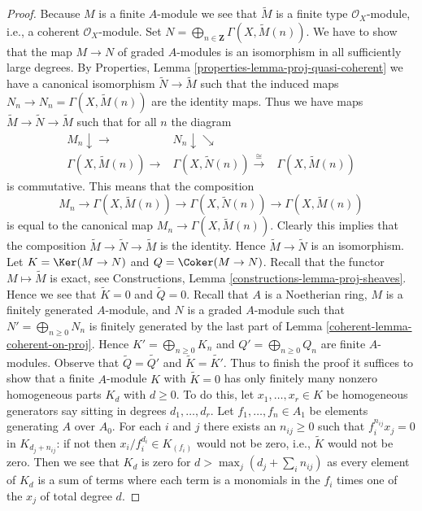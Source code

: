 \begin{proof}
Because $M$ is a finite $A$-module we see that
$\widetilde{M}$ is a finite type $\mathcal{O}_X$-module,
i.e., a coherent $\mathcal{O}_X$-module.
Set $N = \bigoplus_{n \in \mathbf{Z}} \Gamma(X, \widetilde{M}(n))$.
We have to show that the map $M \to N$ of graded $A$-modules
is an isomorphism in all sufficiently large degrees.
By Properties, Lemma \ref{properties-lemma-proj-quasi-coherent}
we have a canonical isomorphism $\widetilde{N} \to \widetilde{M}$
such that the induced maps $N_n \to N_n = \Gamma(X, \widetilde{M}(n))$
are the identity maps. Thus we have maps
$\widetilde{M} \to \widetilde{N} \to \widetilde{M}$
such that for all $n$ the diagram
$$
\begin{array}{ccc}M_n \downarrow\longrightarrow & N_n \downarrow\searrow &  \\ \Gamma(X, \widetilde{M}(n)) \longrightarrow & \Gamma(X, \widetilde{N}(n)) \overset{\cong}{\longrightarrow} & \Gamma(X, \widetilde{M}(n))\end{array}
$$
is commutative. This means that the composition
$$
M_n \to \Gamma(X, \widetilde{M}(n))
\to \Gamma(X, \widetilde{N}(n)) \to \Gamma(X, \widetilde{M}(n))
$$
is equal to the canonical map $M_n \to \Gamma(X, \widetilde{M}(n))$.
Clearly this implies that the composition
$\widetilde{M} \to \widetilde{N} \to \widetilde{M}$
is the identity. Hence $\widetilde{M} \to \widetilde{N}$ is an isomorphism.
Let $K = \Ker(M \to N)$ and $Q = \Coker(M \to N)$.
Recall that the functor $M \mapsto \widetilde{M}$ is exact, see
Constructions, Lemma \ref{constructions-lemma-proj-sheaves}.
Hence we see that $\widetilde{K} = 0$ and $\widetilde{Q} = 0$.
Recall that $A$ is a Noetherian ring, $M$ is a finitely generated
$A$-module, and $N$ is a graded $A$-module such that
$N' = \bigoplus_{n \geq 0} N_n$ is finitely generated by
the last part of Lemma \ref{coherent-lemma-coherent-on-proj}.
Hence $K' = \bigoplus_{n \geq 0} K_n$ and
$Q' = \bigoplus_{n \geq 0} Q_n$ are finite $A$-modules.
Observe that $\widetilde{Q} = \widetilde{Q'}$ and
$\widetilde{K} = \widetilde{K'}$.
Thus to finish the proof it suffices to show
that a finite $A$-module $K$ with $\widetilde{K} = 0$
has only finitely many nonzero homogeneous parts $K_d$ with $d \geq 0$.
To do this, let $x_1, \ldots, x_r \in K$ be homogeneous generators
say sitting in degrees $d_1, \ldots, d_r$.
Let $f_1, \ldots, f_n \in A_1$ be elements generating $A$ over $A_0$.
For each $i$ and $j$ there exists an $n_{ij} \geq 0$ such that
$f_i^{n_{ij}} x_j = 0$ in $K_{d_j + n_{ij}}$: if not then
$x_i/f_i^{d_i} \in K_{(f_i)}$ would not be zero, i.e., $\widetilde{K}$
would not be zero.
Then we see that $K_d$ is zero for $d > \max_j(d_j + \sum_i n_{ij})$
as every element of $K_d$ is a sum of terms where each term is a
monomials in the $f_i$ times one of the $x_j$ of total degree $d$.
\end{proof}

